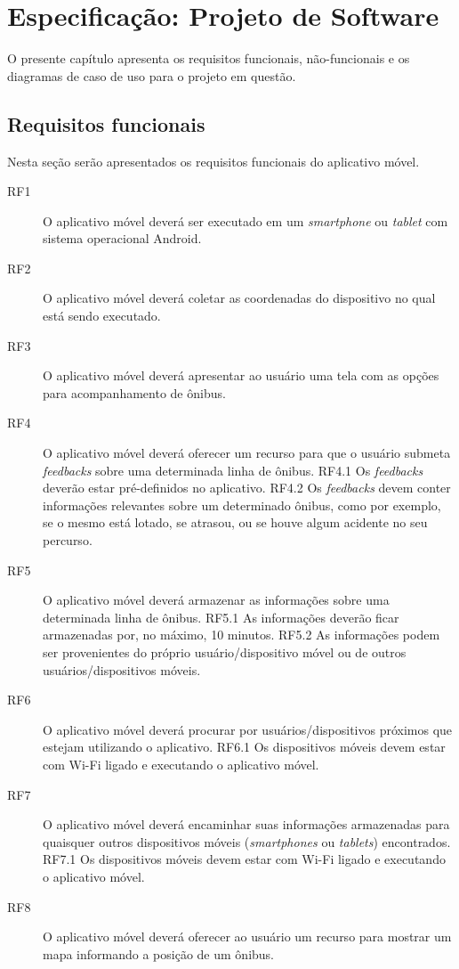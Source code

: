 \chapter{Especificação: Projeto de Software}\label{cap:especificacao}

O presente capítulo apresenta os requisitos funcionais, não-funcionais e os diagramas de caso de uso para o projeto em questão.

\section{Requisitos funcionais}

Nesta seção serão apresentados os requisitos funcionais do aplicativo móvel.

\begin{description}
  \item[RF1] O aplicativo móvel deverá ser executado em um \textit{smartphone} ou \textit{tablet} com sistema operacional Android.
  \item[RF2] O aplicativo móvel deverá coletar as coordenadas do dispositivo no qual está sendo executado.
  \item[RF3] O aplicativo móvel deverá apresentar ao usuário uma tela com as opções para acompanhamento de ônibus.
  \item[RF4] O aplicativo móvel deverá oferecer um recurso para que o usuário submeta \textit{feedbacks} sobre uma determinada linha de ônibus.
  \subitem RF4.1 Os \textit{feedbacks} deverão estar pré-definidos no aplicativo.
  \subitem RF4.2 Os \textit{feedbacks} devem conter informações relevantes sobre um determinado ônibus, como por exemplo, se o mesmo está lotado, se atrasou, ou se houve algum acidente no seu percurso.
  \item[RF5] O aplicativo móvel deverá armazenar as informações sobre uma determinada linha de ônibus.
  \subitem RF5.1 As informações deverão ficar armazenadas por, no máximo, 10 minutos.
  \subitem RF5.2 As informações podem ser provenientes do próprio usuário/dispositivo móvel ou de outros usuários/dispositivos móveis.
  \item[RF6] O aplicativo móvel deverá procurar por usuários/dispositivos próximos que estejam utilizando o aplicativo.
  \subitem RF6.1 Os dispositivos móveis devem estar com Wi-Fi ligado e executando o aplicativo móvel.
  \item[RF7] O aplicativo móvel deverá encaminhar suas informações armazenadas para quaisquer outros dispositivos móveis (\textit{smartphones} ou \textit{tablets}) encontrados.
  \subitem RF7.1 Os dispositivos móveis devem estar com Wi-Fi ligado e executando o aplicativo móvel.
  \item[RF8] O aplicativo móvel deverá oferecer ao usuário um recurso para mostrar um mapa informando a posição de um ônibus.
\end{description}

